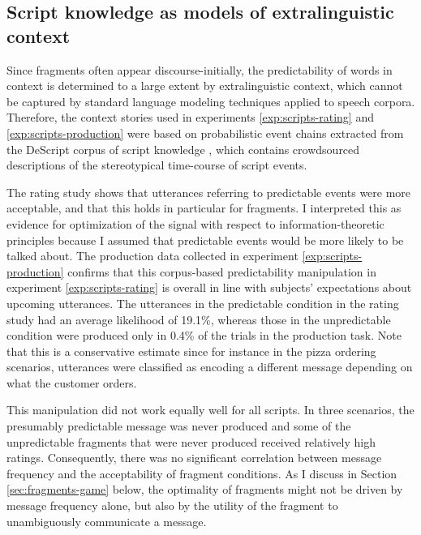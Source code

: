 \subsection{Script knowledge as models of extralinguistic context}
Since fragments often appear discourse-initially, the predictability of words in context is determined to a large extent by extralinguistic context, which cannot be captured by standard language modeling techniques applied to speech corpora. Therefore, the context stories used in experiments \ref{exp:scripts-rating} and \ref{exp:scripts-production} were based on probabilistic event chains extracted from the DeScript corpus of script knowledge \citep{wanzare.etal2016}, which contains crowdsourced descriptions of the stereotypical time-course of script events.

The rating study shows that utterances referring to predictable events were more acceptable, and that this holds in particular for fragments. I interpreted this as evidence for optimization of the signal with respect to information-theoretic principles because I assumed that predictable events would be more likely to be talked about. The production data collected in experiment \ref{exp:scripts-production} confirms that this corpus-based predictability manipulation in experiment \ref{exp:scripts-rating} is overall in line with subjects' expectations about upcoming utterances. The utterances in the predictable condition in the rating study had an average likelihood  of 19.1\%, whereas those in the unpredictable condition were produced only in 0.4\% of the trials in the production task. Note that this is a conservative estimate since for instance in the pizza ordering scenarios, utterances were classified as encoding a different message depending on what the customer orders.

This manipulation did not work equally well for all scripts. In three scenarios, the presumably predictable message was never produced and some of the unpredictable fragments that were never produced received relatively high ratings. Consequently, there was no significant correlation between message frequency and the acceptability of fragment conditions. As I discuss in Section \ref{sec:fragments-game} below, the optimality of fragments might not be driven by message frequency alone, but also by the utility of the fragment to unambiguously communicate a message.

